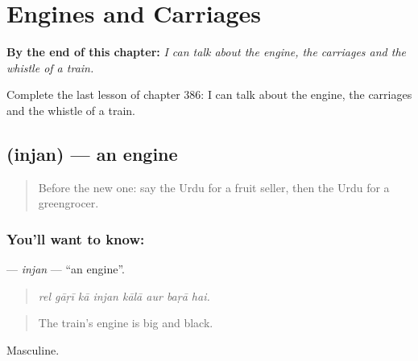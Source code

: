 
\chapter{Engines and Carriages}
\label{ch:ur-engines-and-carriages}

\begin{chapteropening}
\textbf{By the end of this chapter:} \emph{I can talk about the engine, the carriages and the whistle of a train.}

Complete the last lesson of chapter 386: I can talk about the engine, the carriages and the whistle of a train.
\end{chapteropening}

\section[\texorpdfstring{\ur{انجن} (injan)}{انجن (injan)}]{ (injan) — an engine}

\label{lesson:UR-C386-injan}



\begin{quote}
Before the new one: say the Urdu for a fruit seller, then the Urdu for a greengrocer.
\end{quote}

\subsection*{You'll want to know: }
\textbf{} — \emph{injan} — \textquotedblleft{}an engine\textquotedblright{}.

\begin{quote}
       
\end{quote}

\begin{quote}
\emph{rel gāṛī kā injan kālā aur baṛā hai.}
\end{quote}

\begin{quote}
The train's engine is big and black.
\end{quote}

Masculine.

